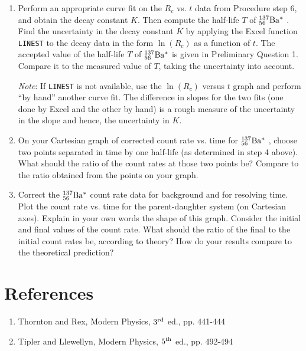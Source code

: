 \documentclass{article}
\newcommand{\bam}{${}^{137}_{56}{\rm Ba^* }$ }
\begin{document}
\begin{enumerate}
\item Perform an appropriate curve fit on the $R_{c}$ vs. $t$ data
from Procedure step 6, and obtain the decay
constant $K$. Then compute the half-life $T$ of \bam.  Find the
uncertainty in the decay constant $K$ by applying the Excel function
{\tt LINEST} to the decay data in the form $\ln(R_{c})$ as a
function of $t$.  The accepted value of the half-life $T$ of \bam is
given in Preliminary Question 1. Compare it to the measured value of $T$,
taking the uncertainty into account.

{\em Note}: If {\tt LINEST} is not available, use the $\ln(R_{c})$ versus
$t$  graph and perform ``by hand'' another
curve fit.  The difference in slopes for the two fits (one done by
Excel and the other by hand) is a rough measure of the uncertainty in
the slope and hence, the uncertainty in $K$.

\item On your Cartesian graph of corrected count rate vs. time
for \bam, choose two points separated in time by one half-life (as
determined in step 4 above).  What should the ratio of the count rates
at those two points be?  Compare to the ratio obtained from the points
on your graph.

\item Correct the \bam count rate data for background and for
resolving time. Plot the count rate vs. time for the
parent-daughter system (on Cartesian axes).  Explain in your own words
the shape of this graph.  Consider the initial and final values of the
count rate.  What should the ratio of the final to the initial count
rates be, according to theory?  How do your results compare to the
theoretical prediction?
\end{enumerate}

\section{References}
\begin{enumerate}
\item Thornton and Rex, Modern Physics, $3^{\rm rd}$ ed., pp. 441-444
\item Tipler and Llewellyn, Modern Physics, $5^{\rm th}$ ed., pp. 492-494
\end{enumerate}
\end{document}
